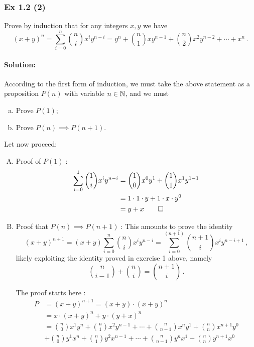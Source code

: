 \subsubsection{Ex 1.2 (2)}\label{sec:Ex_1.2.2}
Prove by induction that for any integers $x, y$ we have
$$ 
(x + y)^n = \sum_{i=0}^{n} \binom{n}{i} x^i y^{n-i} = y^n + \binom{n}{1} x y^{n-1} + \binom{n}{2} x^2 y^{n-2}
+ \cdots + x^n\,.
$$

%
%
\paragraph{Solution:}{
According to the first form of induction, we must take the above statement as a proposition $P(n)$ with variable $n \in \mathbb{N}$, and we must
\begin{enumerate}[a)]
\item Prove $P(1)$;
\item Prove $P(n) \implies P(n+1)$. 
\end{enumerate}

Let now proceed:

\begin{enumerate}[A)]
\item Proof of $P(1)\;$:
\begin{align*}
	\sum_{i=0}^{1} \binom{1}{i} x^i y^{n-i} &= \binom{1}{0} x^0 y^1 + \binom{1}{1} x^1 y^{1-1}\\
	                                        &= 1 \cdot 1 \cdot y + 1 \cdot x \cdot y^0\\
	                                        &= y + x \qed
\end{align*}
\item Proof that $P(n) \implies P(n+1)\;$:
This amounts to prove the identity
$$ (x + y)^{n+1} = (x + y) \sum_{i=0}^{n} \binom{n}{i} x^i y^{n-i} = \sum_{i=0}^{(n+1)} \binom{n+1}{i} x^i y^{n-i+1}\,,$$
likely exploiting the identity proved in exercise 1 above, namely
$$\binom{n}{i-1} + \binom{n}{i} = \binom{n+1}{i}\,.$$
 
The proof starts here :
\begin{align*}
P &=  (x + y)^{n+1} = (x + y) \cdot (x + y)^n\\
  &=  x \cdot (x + y)^n + y \cdot (y + x)^n \\
  &=  \binom{n}{0} x^1 y^{n} + \binom{n}{1} x^2 y^{n-1} + \cdots + \binom{n}{n-1} x^{n} y^{1}  + \binom{n}{n} x^{n+1} y^{0}\\
  &+  \binom{n}{0} y^1 x^{n} + \binom{n}{1} y^2 x^{n-1} + \cdots + \binom{n}{n-1} y^{n} x^{1}  + \binom{n}{n} y^{n+1} x^{0}
\end{align*}
 

\end{enumerate}}
